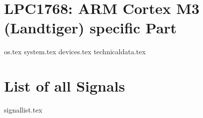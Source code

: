 \documentclass[12pt]{scrbook}
\begin{document}
\chapter{LPC1768: ARM Cortex M3 (Landtiger) specific Part}
{os.tex}
{system.tex}
{devices.tex}
{technicaldata.tex}

\chapter{List of all Signals}
{signallist.tex}


\end{document}

